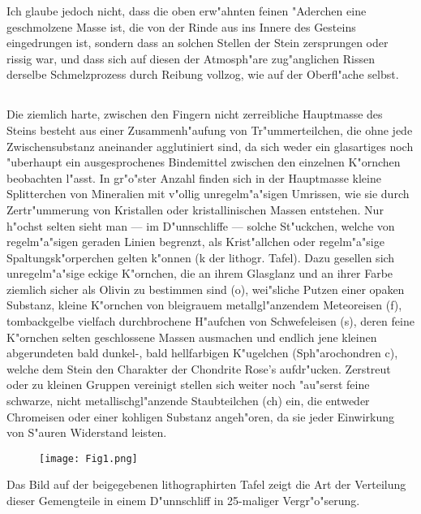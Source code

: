 \documentclass[a4paper, 11pt, oneside]{article}
\begin{document}
Ich glaube jedoch nicht, dass die oben erw"ahnten feinen "Aderchen eine geschmolzene Masse ist, die von der Rinde aus ins Innere des Gesteins eingedrungen ist, sondern dass an solchen Stellen der Stein zersprungen oder rissig war, und dass sich auf diesen der Atmosph"are zug"anglichen Rissen derselbe Schmelzprozess durch Reibung vollzog, wie auf der Oberfl"ache selbst.
\clearpage
\subsection{}
\paragraph{}
Die ziemlich harte, zwischen den Fingern nicht zerreibliche Hauptmasse des Steins besteht aus einer Zusammenh"aufung von Tr"ummerteilchen, die ohne jede Zwischensubstanz aneinander agglutiniert sind, da sich weder ein glasartiges noch "uberhaupt ein ausgesprochenes Bindemittel zwischen den einzelnen K"ornchen beobachten l"asst. In gr"o"ster Anzahl finden sich in der Hauptmasse kleine Splitterchen von Mineralien mit v"ollig unregelm"a"sigen Umrissen, wie sie durch Zertr"ummerung von Kristallen oder kristallinischen Massen entstehen. Nur h"ochst selten sieht man --- im D"unnschliffe --- solche St"uckchen, welche von regelm"a"sigen geraden Linien begrenzt, als Krist"allchen oder regelm"a"sige Spaltungsk"orperchen gelten k"onnen (k der lithogr. Tafel). Dazu gesellen sich unregelm"a"sige eckige K"ornchen, die an ihrem Glasglanz und an ihrer Farbe ziemlich sicher als Olivin zu bestimmen sind (o), wei"sliche Putzen einer opaken Substanz, kleine K"ornchen von bleigrauem metallgl"anzendem Meteoreisen (f), tombackgelbe vielfach durchbrochene H"aufchen von Schwefeleisen (s), deren feine K"ornchen selten geschlossene Massen ausmachen und endlich jene kleinen abgerundeten bald dunkel-, bald hellfarbigen K"ugelchen (Sph"arochondren c), welche dem Stein den Charakter der Chondrite Rose's aufdr"ucken. Zerstreut oder zu kleinen Gruppen vereinigt stellen sich weiter noch "au"serst feine schwarze, nicht metallischgl"anzende Staubteilchen (ch) ein, die entweder Chromeisen oder einer kohligen Substanz angeh"oren, da sie jeder Einwirkung von S"auren Widerstand leisten.
\clearpage
\begin{figure}[t]
\centering
\texttt{[image: Fig1.png]}
\caption{}
\end{figure}
Das Bild auf der beigegebenen lithographirten Tafel zeigt die Art der Verteilung dieser Gemengteile in einem D"unnschliff in 25-maliger Vergr"o"serung.
\end{document}
